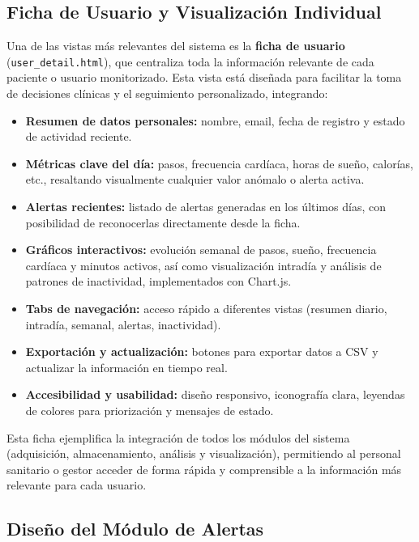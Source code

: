 \subsection*{Ficha de Usuario y Visualización Individual}
Una de las vistas más relevantes del sistema es la \textbf{ficha de usuario} (\texttt{user\_detail.html}), que centraliza toda la información relevante de cada paciente o usuario monitorizado. Esta vista está diseñada para facilitar la toma de decisiones clínicas y el seguimiento personalizado, integrando:

\begin{itemize}
    \item \textbf{Resumen de datos personales:} nombre, email, fecha de registro y estado de actividad reciente.
    \item \textbf{Métricas clave del día:} pasos, frecuencia cardíaca, horas de sueño, calorías, etc., resaltando visualmente cualquier valor anómalo o alerta activa.
    \item \textbf{Alertas recientes:} listado de alertas generadas en los últimos días, con posibilidad de reconocerlas directamente desde la ficha.
    \item \textbf{Gráficos interactivos:} evolución semanal de pasos, sueño, frecuencia cardíaca y minutos activos, así como visualización intradía y análisis de patrones de inactividad, implementados con Chart.js.
    \item \textbf{Tabs de navegación:} acceso rápido a diferentes vistas (resumen diario, intradía, semanal, alertas, inactividad).
    \item \textbf{Exportación y actualización:} botones para exportar datos a CSV y actualizar la información en tiempo real.
    \item \textbf{Accesibilidad y usabilidad:} diseño responsivo, iconografía clara, leyendas de colores para priorización y mensajes de estado.
\end{itemize}

Esta ficha ejemplifica la integración de todos los módulos del sistema (adquisición, almacenamiento, análisis y visualización), permitiendo al personal sanitario o gestor acceder de forma rápida y comprensible a la información más relevante para cada usuario.

\subsection{Diseño del Módulo de Alertas}
\label{subsec:diseno_alertas}

